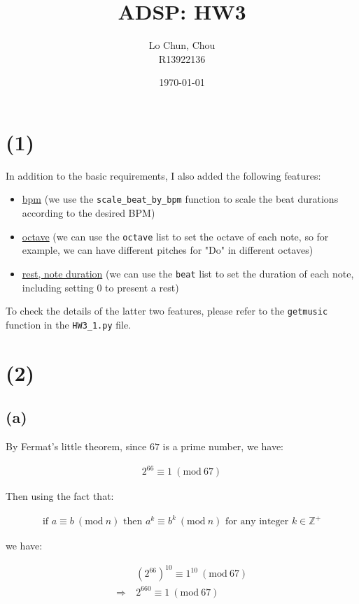 \documentclass{article}
\title{ADSP: HW3}
\author{Lo Chun, Chou \\ R13922136}
\date\today
\newcommand{\modwos}[1]{\ (\mathrm{mod}\ #1)}
\begin{document}
\setlength{\parindent}{0pt}
\maketitle 

\section*{(1)}

In addition to the basic requirements, I also added the following features:
\begin{itemize}
    \item \underline{bpm} (we use the \lstinline{scale_beat_by_bpm} function to scale the beat durations according to the desired BPM)
    \item \underline{octave} (we can use the \lstinline{octave} list to set the octave of each note, so for example, we can have different pitches for "Do" in different octaves)
    \item \underline{rest, note duration} (we can use the \lstinline{beat} list to set the duration of each note, including setting $0$ to present a rest)
\end{itemize}

To check the details of the latter two features, please refer to the \lstinline{getmusic} function in the \lstinline{HW3_1.py} file.

\section*{(2)}

\subsection*{(a)}

By Fermat's little theorem, since $67$ is a prime number, we have:

\begin{align*}
    2^{66} \equiv 1 \modwos{67}
\end{align*}

Then using the fact that:

\begin{align*}
    \text{if } a \equiv b \modwos{n} \text{ then } a^k \equiv b^k \modwos{n} \text{ for any integer } k \in \mathbb{Z}^+
\end{align*}

we have:

\begin{align*}
    &(2^{66})^{10} \equiv 1^{10} \modwos{67} \\
    \Rightarrow \ & 2^{660} \equiv 1 \modwos{67}
\end{align*}
\end{document}
